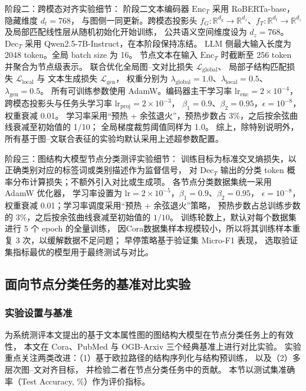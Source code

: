 {阶段二：跨模态对齐实验细节：}
阶段二文本编码器 \(\mathrm{Enc}_T\) 采用 RoBERTa-base，隐藏维度 \(d_t = 768\)，
与图侧一同更新。跨模态投影头 \(f_G:\mathbb{R}^{d_g}\rightarrow\mathbb{R}^{d_z}\)、\(f_T:\mathbb{R}^{d_t}\rightarrow\mathbb{R}^{d_z}\) 及局部匹配线性层从随机初始化开始训练，
公共语义空间维度设为 \(d_z = 768\)。
\(\mathrm{Dec}_T\) 采用 Qwen2.5-7B-Instruct\cite{Yang2024Qwen25TR}，在本阶段保持冻结。
LLM 侧最大输入长度为 2048 token。全局 batch size 为 16。
节点文本在输入 \(\mathrm{Enc}_T\) 时截断至 256 token 并聚合为节点级表示。
 联合优化全局图–文对比损失 \(\mathcal{L}_{\mathrm{global}}\)、
 局部子结构匹配损失 \(\mathcal{L}_{\mathrm{local}}\) 与
 文本生成损失 \(\mathcal{L}_{\mathrm{gen}}\)，
 权重分别为 \(\lambda_{\mathrm{global}} = 1.0\)、\(\lambda_{\mathrm{local}} = 0.5\)、
 \(\lambda_{\mathrm{gen}} = 0.5\)。
所有可训练参数使用 AdamW。编码器主干学习率 \(\mathrm{lr}_{\mathrm{enc}} = 2\times10^{-4}\)，
跨模态投影头与任务头学习率 \(\mathrm{lr}_{\mathrm{proj}} = 2\times10^{-3}\)，
\(\beta_1 = 0.9\)、\(\beta_2 = 0.95\)，\(\epsilon = 10^{-8}\)，权重衰减 0.01。
学习率采用“预热 + 余弦退火”，预热步数占 3\%，之后按余弦曲线衰减至初始值的 1/10；
全局梯度裁剪阈值同样为 1.0。
综上，除特别说明外，所有基于图–文联合表征的实验均默认采用上述超参数配置。

{阶段三：图结构大模型节点分类测评实验细节：}
训练目标为标准交叉熵损失，以正确类别对应的标签词或类别描述作为监督信号，
对 \(\mathrm{Dec}_T\) 输出的分类 token 概率分布计算损失；不额外引入对比或生成项。
各节点分类数据集统一采用 AdamW 优化器，
学习率设置为 \(\mathrm{lr}=2\times10^{-5}\)，\(\beta_1 = 0.9\)、\(\beta_2 = 0.95\)，
\(\epsilon = 10^{-8}\)，权重衰减 0.01；学习率调度采用“预热 + 余弦退火”策略，
预热步数占总训练步数的 3\%，之后按余弦曲线衰减至初始值的 \(1/10\)。
训练轮数上，默认对每个数据集进行 5 个 epoch 的全量训练，
因Cora数据集样本规模较小，所以将其训练样本重复 3 次，以缓解数据不足问题；
早停策略基于验证集 Micro-F1 表现，
选取验证集指标最优的模型用于最终测试与对比。


\subsection{面向节点分类任务的基准对比实验}
\label{subsec:node_classification_analysis}

\subsubsection{实验设置与基准}

为系统测评本文提出的基于文本属性图的图结构大模型在节点分类任务上的有效性，
本文在 Cora、PubMed 与 OGB-Arxiv 三个经典基准上进行对比实验。
实验重点关注两类改进：{（1）基于欧拉路径的结构序列化与结构预训练}，
以及{（2）多层次图--文对齐目标}，
并检验二者在节点分类任务中的贡献。
本节以测试集准确率（Test Accuracy, \%）作为评价指标。

